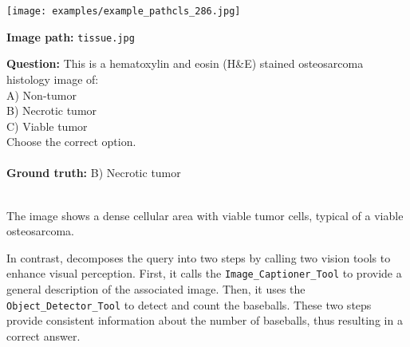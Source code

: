 
\begin{querybox}
\begin{minipage}{0.3\linewidth}
    \texttt{[image: examples/example\_pathcls\_286.jpg]}
\end{minipage}
\hspace{5pt}
\begin{minipage}{0.55\linewidth}
    \vspace{-20pt}
    \textbf{Image path:} \texttt{tissue.jpg}
    
    \textbf{Question:} This is a hematoxylin and eosin (H\&E) stained osteosarcoma histology image of:\\
    A) Non-tumor\\
    B) Necrotic tumor\\
    C) Viable tumor\\
    Choose the correct option.
    \\\\
    \textbf{Ground truth:} B) Necrotic tumor
\end{minipage}
\end{querybox}


\begin{querybox}
\\
The image shows a dense cellular area with viable tumor cells, typical of a viable osteosarcoma.
\end{querybox}

In contrast, \model decomposes the query into two steps by calling two vision tools to enhance visual perception. First, it calls the \texttt{Image\_Captioner\_Tool} to provide a general description of the associated image. Then, it uses the \texttt{Object\_Detector\_Tool} to detect and count the baseballs. These two steps provide consistent information about the number of baseballs, thus resulting in a correct answer.

